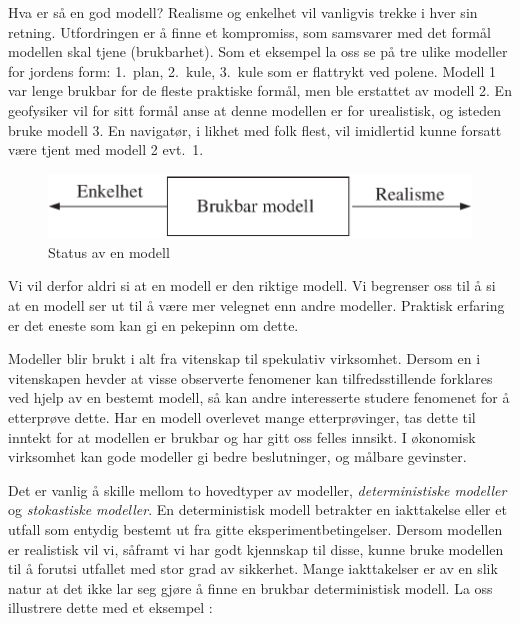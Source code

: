 \noindent
Hva er så en god modell? Realisme og enkelhet vil vanligvis trekke i hver
sin retning. Utfordringen er å finne et kompromiss, som samsvarer med det
formål modellen skal tjene (brukbarhet).  Som et eksempel la oss
se på tre ulike modeller for jordens form:  1.\ plan, 2.\ kule, 3.\
kule som er flattrykt ved polene.  Modell 1 var lenge brukbar
for de fleste praktiske formål, men ble erstattet av modell 2.
En geofysiker vil for sitt formål anse at denne modellen er for urealistisk,
og isteden bruke modell 3. En navigatør, i likhet med folk flest, vil
imidlertid kunne forsatt være tjent med modell 2 evt.\ 1.
\begin{figure}[ht]
\centering \centering
 \includegraphics[scale=0.7]{figurer/fig1_1.pdf} 
 \caption{Status av en modell}
	\label{fig:status_modell}
\end{figure}
\noindent
Vi vil derfor aldri si at en modell er den riktige modell.
Vi begrenser oss til å si at en modell ser ut til å være mer
velegnet enn andre modeller.  Praktisk erfaring er det eneste som kan gi en
pekepinn om dette. 

Modeller blir brukt i alt fra vitenskap til spekulativ virksomhet.
Dersom en i vitenskapen hevder at visse observerte
fenomener kan tilfredsstillende forklares ved hjelp av en bestemt modell, 
så kan andre interesserte studere fenomenet for å etterprøve dette.
Har en modell overlevet mange etterprøvinger, tas dette til inntekt for at
modellen er brukbar og har gitt oss felles innsikt.
I økonomisk virksomhet kan gode modeller gi bedre beslutninger, og 
målbare gevinster.

Det er vanlig å skille mellom to hovedtyper av modeller,
{\em deterministiske modeller} og {\em stokastiske modeller}. En
deterministisk modell betrakter en iakttakelse eller et utfall
som entydig bestemt ut fra gitte eksperimentbetingelser. Dersom modellen er
realistisk vil vi, såframt vi har godt kjenn\-skap til disse, kunne bruke
modellen til å forutsi utfallet med stor grad av sikkerhet. 
Mange iakttakelser er av en slik natur at det ikke lar seg gjøre å
finne en brukbar deterministisk modell.  La oss illustrere dette med et
eksempel :

